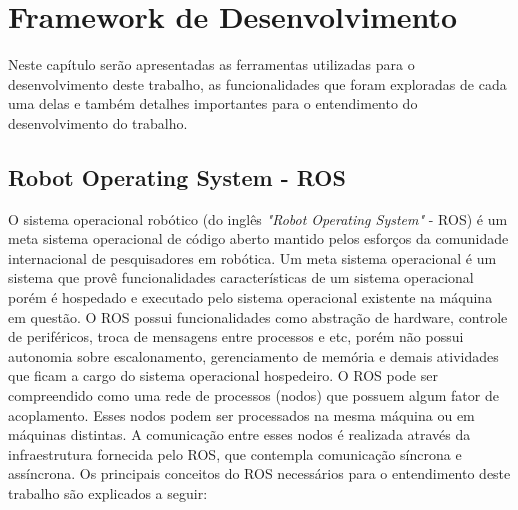 \chapter{Framework de Desenvolvimento}\label{chap3:framework_desenvolvimento}
    
    
    Neste capítulo serão apresentadas as ferramentas utilizadas para o desenvolvimento deste trabalho, as funcionalidades que foram exploradas de cada uma delas e também detalhes importantes para o entendimento do desenvolvimento do trabalho.
    
    \section{Robot Operating System - ROS} \label{subchap3:ros}
        O sistema operacional robótico (do inglês \textit{"Robot Operating System"} - ROS) é um meta sistema operacional de código aberto mantido pelos esforços da comunidade internacional de pesquisadores em robótica. Um meta sistema operacional é um sistema que provê funcionalidades características de um sistema operacional porém é hospedado e executado pelo sistema operacional existente na máquina em questão.
        O ROS possui funcionalidades como abstração de hardware, controle de periféricos, troca de mensagens entre processos e etc, porém não possui autonomia sobre escalonamento, gerenciamento de memória e demais atividades que ficam a cargo do sistema operacional hospedeiro. O ROS pode ser compreendido como uma rede de processos (nodos) que possuem algum fator de acoplamento. Esses nodos podem ser processados na mesma máquina ou em máquinas distintas. A comunicação entre esses nodos é realizada 
        através da infraestrutura fornecida pelo ROS, que contempla comunicação síncrona e assíncrona. Os principais conceitos do ROS necessários para o entendimento deste trabalho são explicados a seguir:
        
